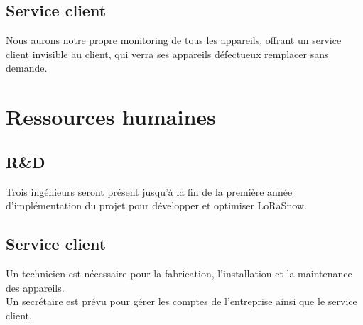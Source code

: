 \subsection{Service client}
Nous aurons notre propre monitoring de tous les appareils, offrant un service client
invisible au client, qui verra ses appareils défectueux remplacer sans demande.

\section{Ressources humaines}
\subsection{R\&D}
Trois ingénieurs seront présent jusqu'à la fin de la première année
d'implémentation du projet pour développer et optimiser LoRaSnow.

\subsection{Service client}
Un technicien est nécessaire pour la fabrication,
l'installation et la maintenance des appareils.\\
Un secrétaire est prévu pour gérer les comptes de l'entreprise
ainsi que le service client.
